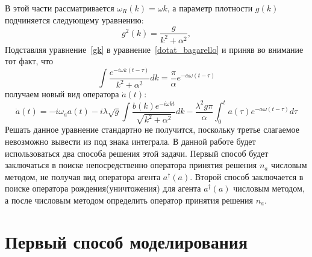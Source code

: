 В этой части рассматривается $\omega_{R}(k) = \omega k$, а параметр плотности $g(k)$ подчиняется
следующему уравнению:
\begin{equation}\label{gk}
    g^{2}(k) = \frac{g}{k^{2} + \alpha^{2}},
\end{equation}
Подставляя уравнение~\eqref{gk} в уравнение~\eqref{dotat_bagarello} и приняв во внимание тот факт, что
\begin{equation}
    \int \frac{e^{-i \omega k (t - \tau)}}{k^{2} + \alpha^{2}} dk = \frac{\pi}{\alpha} e^{-\alpha \omega (t - \tau)}
\end{equation}
получаем новый вид оператора $\dot{a}(t)$:
\begin{equation}\label{dotat}
    \dot{a}(t) =
    -i \omega_{a} a(t)
    -i \lambda \sqrt{g} \int \frac{b(k)e^{-i \omega k t}}{\sqrt{k^{2} + \alpha^2}} dk
    -\frac{\lambda^{2} g \pi}{\alpha} \int_{0}^{t} a(\tau) e^{- \alpha \omega (t - \tau)} d\tau
\end{equation}
Решать данное уравнение стандартно не получится, поскольку третье слагаемое невозможно вывести из
под знака интеграла.
В данной работе будет использоваться два способа решения этой задачи.
Первый способ будет заключаться в поиске непосредственно оператора принятия решения $n_{a}$ числовым
методом, не получая вид оператора агента $a^{\dagger}(a)$.
Второй способ заключается в поиске оператора рождения(уничтожения) для агента $a^{\dagger}(a)$ числовым
методом, а после числовым методом определить оператор принятия решения $n_{a}$.

\section{Первый способ моделирования}

